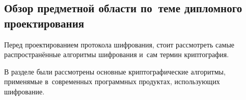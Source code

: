 \subsection{Обзор предметной области по~теме дипломного проектирования}
\label{sec:analysis:research:crypto}

Перед проектированием протокола шифрования, стоит рассмотреть самые распространённые алгоритмы шифрования и~сам термин криптография.





В разделе были рассмотрены основные криптографические алгоритмы, применямые в~современных программных продуктах, использующих шифрование.